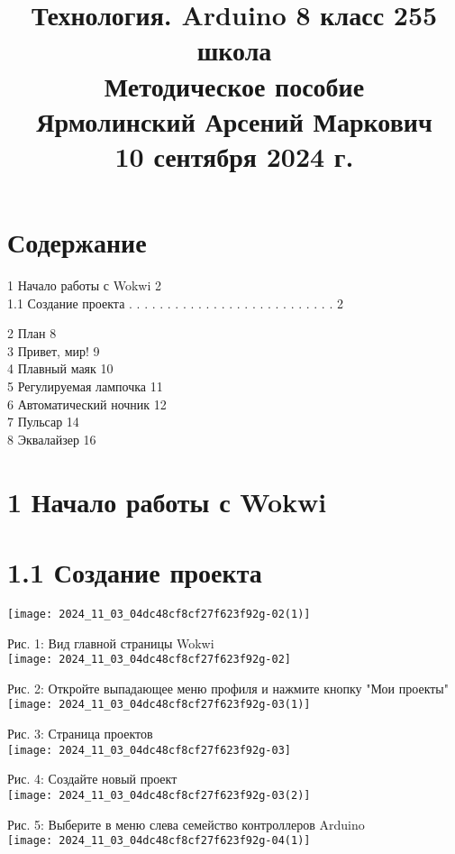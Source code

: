 \documentclass[10pt]{article}
\title{Технология. Arduino 8 класс 255 школа \\
 Методическое пособие \\
 Ярмолинский Арсений Маркович \\
 10 сентября 2024 г. }
\author{}
\date{}
\begin{document}
\maketitle
\section*{Содержание}
1 Начало работы с Wokwi 2\\
1.1 Создание проекта . . . . . . . . . . . . . . . . . . . . . . . . . . . 2

2 План 8\\
3 Привет, мир! 9\\
4 Плавный маяк 10\\
5 Регулируемая лампочка 11\\
6 Автоматический ночник 12\\
7 Пульсар 14\\
8 Эквалайзер 16

\section*{1 Начало работы с Wokwi}
\section*{1.1 Создание проекта}
\begin{center}
\texttt{[image: 2024\_11\_03\_04dc48cf8cf27f623f92g-02(1)]}
\end{center}

Рис. 1: Вид главной страницы Wokwi\\
\texttt{[image: 2024\_11\_03\_04dc48cf8cf27f623f92g-02]}

Рис. 2: Откройте выпадающее меню профиля и нажмите кнопку "Мои проекты"\\
\texttt{[image: 2024\_11\_03\_04dc48cf8cf27f623f92g-03(1)]}

Рис. 3: Страница проектов\\
\texttt{[image: 2024\_11\_03\_04dc48cf8cf27f623f92g-03]}

Рис. 4: Создайте новый проект\\
\texttt{[image: 2024\_11\_03\_04dc48cf8cf27f623f92g-03(2)]}

Рис. 5: Выберите в меню слева семейство контроллеров Arduino\\
\texttt{[image: 2024\_11\_03\_04dc48cf8cf27f623f92g-04(1)]}
\end{document}
